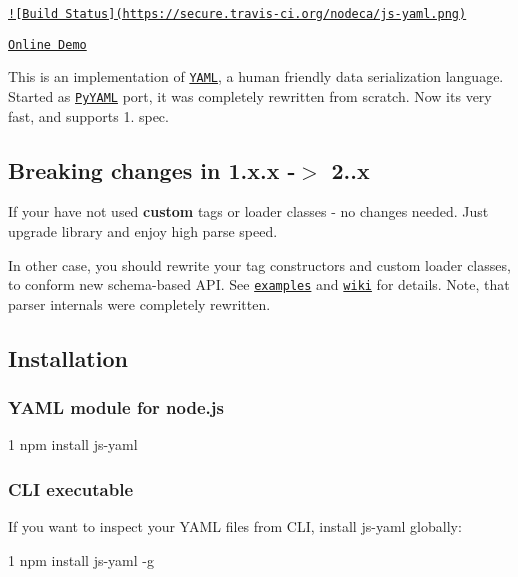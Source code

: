 \href{http://travis-ci.org/nodeca/js-yaml}{\tt !\mbox{[}Build Status\mbox{]}(https\+://secure.\+travis-\/ci.\+org/nodeca/js-\/yaml.\+png)}

\href{http://nodeca.github.com/js-yaml/}{\tt Online Demo}

This is an implementation of \href{http://yaml.org/}{\tt Y\+A\+M\+L}, a human friendly data serialization language. Started as \href{http://pyyaml.org/}{\tt Py\+Y\+A\+M\+L} port, it was completely rewritten from scratch. Now it\textquotesingle{}s very fast, and supports 1. spec.

\subsection*{Breaking changes in 1.\+x.\+x -\/$>$ 2..\+x }

If your have not used {\bfseries custom} tags or loader classes -\/ no changes needed. Just upgrade library and enjoy high parse speed.

In other case, you should rewrite your tag constructors and custom loader classes, to conform new schema-\/based A\+P\+I. See \href{https://github.com/nodeca/js-yaml/tree/master/examples}{\tt examples} and \href{https://github.com/nodeca/js-yaml/wiki}{\tt wiki} for details. Note, that parser internals were completely rewritten.

\subsection*{Installation }

\subsubsection*{Y\+A\+M\+L module for node.\+js}


\begin{DoxyCode}
1 npm install js-yaml
\end{DoxyCode}


\subsubsection*{C\+L\+I executable}

If you want to inspect your Y\+A\+M\+L files from C\+L\+I, install js-\/yaml globally\+:


\begin{DoxyCode}
1 npm install js-yaml -g
\end{DoxyCode}


